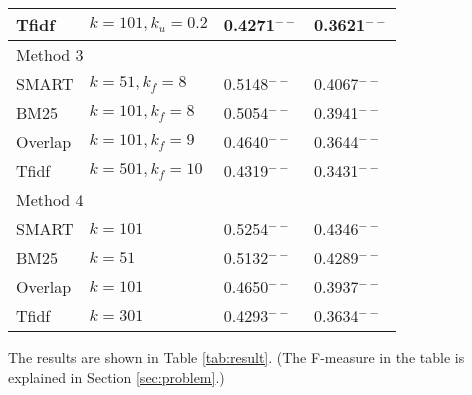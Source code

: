 \documentclass[english]{jnlp_1.2c}
\begin{document}
\begin{table}[t]
\begin{center}
\begin{tabular}{|l|l|l|l|}
Tfidf         & $k=101,k_u=0.2$             & 0.4271$^{--}$     & 0.3621$^{--}$\\
\hline
\multicolumn{4}{|l|}{Method 3} \\\hline                         
SMART         & $k=51,k_f=8$                & 0.5148$^{--}$     & 0.4067$^{--}$\\
BM25          & $k=101,k_f=8$               & 0.5054$^{--}$     & 0.3941$^{--}$\\
Overlap       & $k=101,k_f=9$               & 0.4640$^{--}$     & 0.3644$^{--}$\\
Tfidf         & $k=501,k_f=10$              & 0.4319$^{--}$     & 0.3431$^{--}$\\
\hline
\multicolumn{4}{|l|}{Method 4} \\\hline                         
SMART         & $k=101$                     & 0.5254$^{--}$     & 0.4346$^{--}$\\
BM25          & $k=51$                      & 0.5132$^{--}$     & 0.4289$^{--}$\\
Overlap       & $k=101$                     & 0.4650$^{--}$     & 0.3937$^{--}$\\
Tfidf         & $k=301$                     & 0.4293$^{--}$     & 0.3634$^{--}$\\
\hline
\end{tabular}
\end{center}
\end{table}


The results are shown in Table \ref{tab:result}.
(The F-measure in the table is explained in Section \ref{sec:problem}.)
\end{document}
